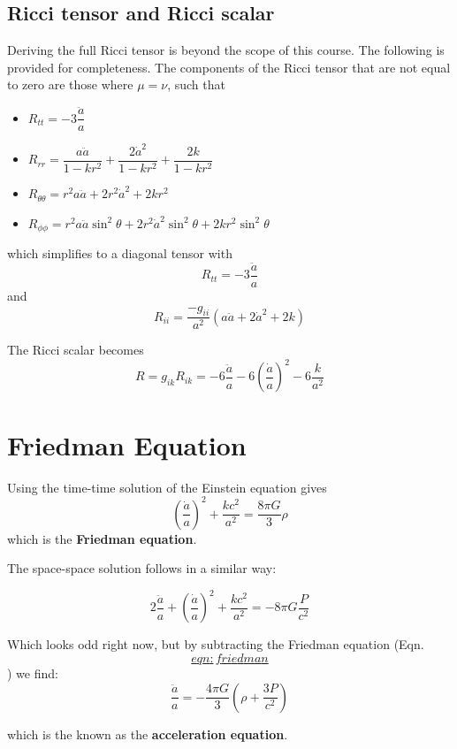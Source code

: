 \documentclass[]{book}
\begin{document}
\hypertarget{sec:ricci}{%
\subsection{Ricci tensor and Ricci scalar}\label{sec:ricci}}

Deriving the full Ricci tensor is beyond the scope of this course. The
following is provided for completeness. The components of the Ricci
tensor that are not equal to zero are those where \(\mu = \nu\), such that

\begin{itemize}
\item
  \(R_{tt} = -3\dfrac{\ddot{a}}{a}\)
\item
  \(R_{rr} = \dfrac{a\ddot{a}}{1 - kr^2} + \dfrac{2\dot{a}^2}{1 - kr^2} + \dfrac{2k}{1-kr^2}\)
\item
  \(R_{\theta\theta} = r^2a\ddot{a} + 2r^2\dot{a}^2 + 2kr^2\)
\item
  \(R_{\phi\phi} = r^2 a\ddot{a}\sin^2\theta + 2r^2\dot{a}^2\sin^2\theta + 2kr^2 \sin^2\theta\)
\end{itemize}

which simplifies to a diagonal tensor with
\[R_{tt}= -3\dfrac{\ddot{a}}{a}\] and
\[R_{ii} = \dfrac{-g_{ii}}{a^2}\left(a\ddot{a} + 2\dot{a}^2 + 2k\right)\]

The Ricci scalar becomes
\[R = g_{ik}R_{ik} = - 6\dfrac{\ddot{a}}{a} - 6\left(\dfrac{\dot{a}}{a}\right)^2 - 6\dfrac{k}{a^2}\]

\hypertarget{sec:friedman}{%
\section{Friedman Equation}\label{sec:friedman}}

Using the time-time solution of the Einstein equation gives
\[\label{eqn:friedman}
    \left(\dfrac{\dot{a}}{a}\right)^2 + \dfrac{kc^2}{a^2} = \dfrac{8\pi G}{3}\rho\]which
is the \textbf{Friedman equation}.

The space-space solution follows in a similar way:

\[2\dfrac{\ddot{a}}{a} + \left(\dfrac{\dot{a}}{a}\right)^2 + \dfrac{kc^2}{a^2} = -8\pi G \dfrac{P}{c^2}\]

Which looks odd right now, but by subtracting the Friedman equation
(Eqn.~\protect\hyperlink{eqn:friedman}{\[eqn:friedman\]}) we find: \[\label{eqn:acceleration}
    \dfrac{\ddot{a}}{a} = -\dfrac{4\pi G}{3}\left(\rho + \dfrac{3P}{c^2}\right)\]

which is the known as the \textbf{acceleration equation}.
\end{document}

